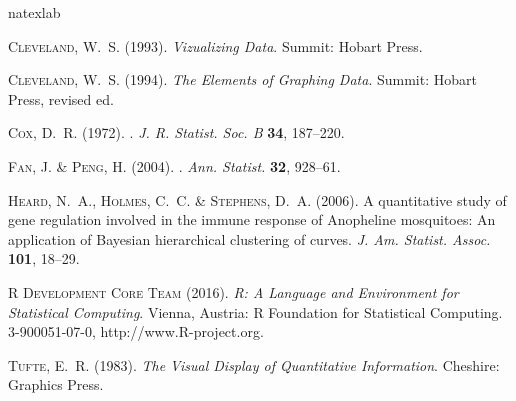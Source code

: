 \documentclass[lineno]{biometrika}
\begin{document}
\begin{thebibliography}{7}
\expandafter\ifx\csname natexlab\endcsname\relax\def\natexlab#1{#1}\fi

\textsc{Cleveland, W.~S.} (1993).
\newblock \textit{{Vizualizing Data}}.
\newblock Summit: Hobart Press.

\textsc{Cleveland, W.~S.} (1994).
\newblock \textit{{The Elements of Graphing Data}}.
\newblock Summit: Hobart Press, revised ed.

\textsc{Cox, D.~R.} (1972).
.
\newblock \textit{J. R. Statist. Soc. {\rm B}} \textbf{34}, 187--220.

\textsc{Fan, J.} \& \textsc{Peng, H.} (2004).
.
\newblock \textit{Ann. Statist.} \textbf{32}, 928--61.

\textsc{Heard, N.~A.}, \textsc{Holmes, C.~C.} \& \textsc{Stephens, D.~A.}
  (2006).
\newblock A quantitative study of gene regulation involved in the immune
  response of {A}nopheline mosquitoes: {A}n application of {B}ayesian
  hierarchical clustering of curves.
\newblock \textit{J. Am. Statist. Assoc.} \textbf{101}, 18--29.

\textsc{{R Development Core Team}} (2016).
\newblock \textit{R: A Language and Environment for Statistical Computing}.
\newblock Vienna, Austria: R Foundation for Statistical Computing.
 3-900051-07-0, http://www.R-project.org.

\textsc{Tufte, E.~R.} (1983).
\newblock \textit{{The Visual Display of Quantitative Information}}.
\newblock Cheshire: Graphics Press.

\end{thebibliography}
\end{document}
